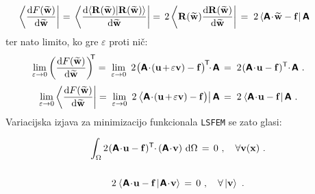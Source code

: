 \begin{equation*}
	\hspace{-10mm}
	\bra{\frac{\ud F(\widetilde{\mathbf{w}})}{\ud \widetilde{\mathbf{w}}}}
	\mkern1mu = \,
	\bra{\frac{\ud \! \bra{\mathbf{R(\widetilde{w})}}\ket{\mathbf{R(\widetilde{w})}}}{\ud \mathbf{\widetilde{w}}}}
	= \mkern3mu
	2 \bra{\mathbf{R(\widetilde{w})} \frac{\ud \mathbf{R(\widetilde{w})}}{\ud \mathbf{\widetilde{w}}}}
	\, = \mkern5mu
	2 \bra{\mathbsf{A} \! \cdot \! \mathbf{\widetilde{w}} - \mathbf{f}} \mathbsf{A}
\end{equation*}
ter nato limito, ko gre $\varepsilon$ proti nič:
\begin{equation*}
	\hspace{-7mm}
	\lim_{\varepsilon \rightarrow 0} \left(\frac{\ud F(\widetilde{\mathbf{w}})}{\ud \widetilde{\mathbf{w}}}\right)^\mathsf{\mkern-7mu T}
	=
	\mkern5mu \lim_{\varepsilon \rightarrow 0} \ 2 \mkern1mu \big(\mathbsf{A} \! \cdot \! (\mathbf{u} \mkern-2mu + \mkern-2mu \varepsilon \mathbf{v}) - \mathbf{f}\big)^\mathsf{\mkern-2mu T} \mkern-6mu \cdot \mkern-2mu \mathbsf{A}\,
	=
	\mkern5mu 2 \mkern1mu (\mathbsf{A} \! \cdot \! \mathbf{u} - \mathbf{f})^\mathsf{T} \mkern-4mu \cdot \mkern-2mu \mathbsf{A} \ .
\end{equation*}
\begin{equation*}
	\hspace{-7mm}
	\lim_{\varepsilon \rightarrow 0} \bra{\frac{\ud F(\widetilde{\mathbf{w}})}{\ud \widetilde{\mathbf{w}}}}
	=
	\mkern5mu \lim_{\varepsilon \rightarrow 0} \ 2 \mkern1mu \bra{\mathbsf{A} \! \cdot \! (\mathbf{u} \mkern-2mu + \mkern-2mu \varepsilon \mathbf{v}) - \mathbf{f}\big)} \mathbsf{A}\,
	=
	\mkern5mu 2 \mkern1mu \bra{\mathbsf{A} \! \cdot \! \mathbf{u} - \mathbf{f}} \mathbsf{A} \ .
\end{equation*}
Variacijska izjava za minimizacijo funkcionala \texttt{LSFEM} se zato glasi:
\begin{equation*}
	\int_{\Omega} 2 \mkern1mu (\mathbsf{A} \! \cdot \! \mathbf{u} - \mathbf{f})^\mathsf{T} \mkern-4.5mu \cdot \mkern-1mu (\mathbsf{A} \! \cdot \! \mathbf{v}) \ \ud \Omega \, = \, 0 \ , \quad \forall \mathbf{v(\mathbf{x})} \ . \vphantom{\Biggr{)}}
\end{equation*}
\begin{equation*}
	2 \mkern1mu \bra{\mkern1mu \mathbsf{A} \! \cdot \! \mathbf{u} - \mathbf{f} \mkern2mu}\ket{\mkern1mu \mathbsf{A} \! \cdot \! \mathbf{v}} \, = \, 0 \ , \quad \forall \ket{\mathbf{v}} \ . \vphantom{\Biggr{)}}
\end{equation*}
